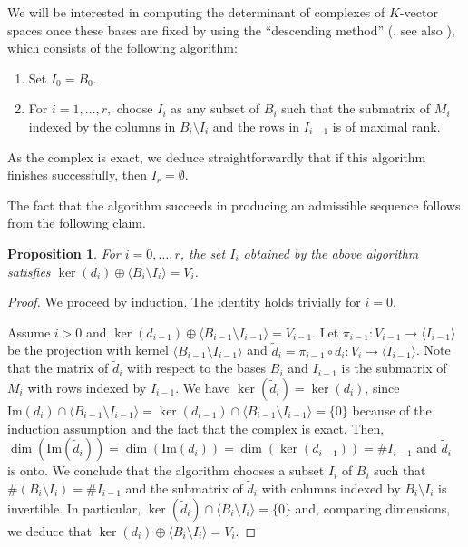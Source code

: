 \documentclass[a4paper,11pt]{amsart}
\newcounter{thm}
\numberwithin{thm}{section}
\numberwithin{equation}{section}
\theoremstyle{definition}
\theoremstyle{plain}
\newtheorem{proposition}[thm]{Proposition}
\begin{document}
We will be interested in computing the determinant of complexes of $K$-vector spaces once these bases are fixed by using the  ``descending method'' (\cite{dem84}, see also \cite{DJ05}), which consists of the following algorithm:
\begin{enumerate}
\item Set $I_0=B_0.$
\item For $i=1,\ldots, r,$ choose $I_{i}$ as any subset of $B_{i}$ such that the submatrix of $M_{i}$ indexed by the columns in $B_{i}\setminus I_{i}$ and the rows in $I_{i-1}$ is of maximal rank.
\end{enumerate}
As the complex is exact, we deduce straightforwardly that if this algorithm finishes successfully, then $I_r=\emptyset.$

The fact that the algorithm succeeds in producing an admissible sequence follows from the following claim.


\begin{proposition}
For $i=0,\dots, r$, the set $I_i$ obtained by the above algorithm satisfies $\ker(d_{i}) \oplus \langle B_{i}\setminus I_i\rangle =V_i$.
\end{proposition}

\begin{proof}
We proceed by induction. The identity holds trivially for $i=0$.

Assume $i>0$ and $\ker(d_{i-1}) \oplus \langle B_{i-1}\setminus I_{i-1}\rangle =V_{i-1}$. Let $\pi_{i-1}: V_{i-1} \to \langle I_{i-1}\rangle$ be the projection with kernel $\langle B_{i-1}\setminus I_{i-1}\rangle$
and  $\tilde d_i=\pi_{i-1} \circ d_i: V_i \to \langle I_{i-1}\rangle$. Note that the matrix of $\tilde d_i$ with respect to the bases $B_i$ and $I_{i-1}$ is the submatrix of $M_i$ with rows indexed by $I_{i-1}$. We have $\ker(\tilde d_i) =\ker(d_i)$, since $\mbox{Im}(d_i) \cap \langle B_{i-1}\setminus I_{i-1}\rangle = \ker (d_{i-1}) \cap \langle B_{i-1}\setminus I_{i-1}\rangle =\{0\}$ because of the induction assumption and the fact that the complex is exact. Then, $\dim(\mbox{Im}(\tilde d_i)) =\dim(\mbox{Im}(d_i))= \dim(\ker (d_{i-1}))= \# I_{i-1}$ and $\tilde d_i$ is onto.
We conclude that the algorithm chooses a subset $I_i$ of $B_i$ such that $\#(B_i \setminus I_i) = \# I_{i-1}$ and the submatrix of $\tilde d_i$ with columns indexed by $B_i \setminus I_i$ is invertible. In particular, $ \ker(\tilde d_i) \cap \langle B_i \setminus I_i\rangle = \{0\}$ and, comparing dimensions, we deduce that $\ker(d_{i}) \oplus \langle B_{i}\setminus I_i\rangle = V_i$.
\end{proof}
\end{document}
